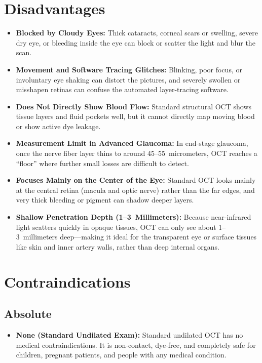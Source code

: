 \section{Disadvantages}
\begin{itemize}
\item \textbf{Blocked by Cloudy Eyes:} Thick cataracts, corneal scars or swelling, severe dry eye, or bleeding inside the eye can block or scatter the light and blur the scan.
\item \textbf{Movement and Software Tracing Glitches:} Blinking, poor focus, or involuntary eye shaking can distort the pictures, and severely swollen or misshapen retinas can confuse the automated layer-tracing software.
\item \textbf{Does Not Directly Show Blood Flow:} Standard structural OCT shows tissue layers and fluid pockets well, but it cannot directly map moving blood or show active dye leakage.
\item \textbf{Measurement Limit in Advanced Glaucoma:} In end-stage glaucoma, once the nerve fiber layer thins to around 45--55~micrometers, OCT reaches a ``floor'' where further small losses are difficult to detect.
\item \textbf{Focuses Mainly on the Center of the Eye:} Standard OCT looks mainly at the central retina (macula and optic nerve) rather than the far edges, and very thick bleeding or pigment can shadow deeper layers.
\item \textbf{Shallow Penetration Depth (1--3~Millimeters):} Because near-infrared light scatters quickly in opaque tissues, OCT can only see about 1--3~millimeters deep---making it ideal for the transparent eye or surface tissues like skin and inner artery walls, rather than deep internal organs.
\end{itemize}

\section{Contraindications}

\subsection{Absolute}
\begin{itemize}
\item \textbf{None (Standard Undilated Exam):} Standard undilated OCT has no medical contraindications. It is non-contact, dye-free, and completely safe for children, pregnant patients, and people with any medical condition.
\end{itemize}

